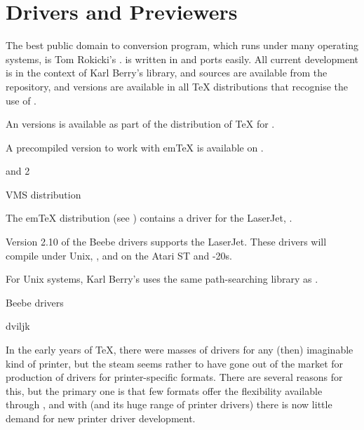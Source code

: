 
\section{ Drivers and Previewers}


The best public domain  to \PS{} conversion program, which
runs under many operating systems, is Tom Rokicki's .
 is written in  and ports easily.  All current
development is in the context of Karl Berry's 
library, and sources are available from the \texlive{} repository,
and versions are available in all \TeX{} distributions that recognise
the use of \PS{}.

An  versions is available as part of the 
distribution of \TeX{} for .

A precompiled version to work with em\TeX{} is available on .
\begin{ctanrefs}
\item[\nothtml{\rmfamily}\MSDOS{} and \latexhtml{\acro{OS/}}{OS/}2]%
\item[\nothtml{\rmfamily}VMS distribution]
\end{ctanrefs}


The em\TeX{} distribution (see )
contains a driver for the LaserJet, .

Version 2.10 of the Beebe drivers supports the LaserJet. These drivers
will compile under Unix, , and on the Atari ST and
-20s.

For Unix systems, Karl Berry's  uses the same
path-searching library as .
\begin{ctanrefs}
\item[\nothtml{\rmfamily}Beebe drivers]
\item[dviljk]
\end{ctanrefs}


In the early years of \TeX{}, there were masses of  drivers
for any (then) imaginable kind of printer, but the steam seems rather
to have gone out of the market for production of drivers for
printer-specific formats.  There are several reasons for this, but the
primary one is that few formats offer the flexibility available
through \PS{}, and with
\href{http://www.ghostscript.com/}{} (and its
huge range of printer drivers) there is now little demand for new
printer driver development.

